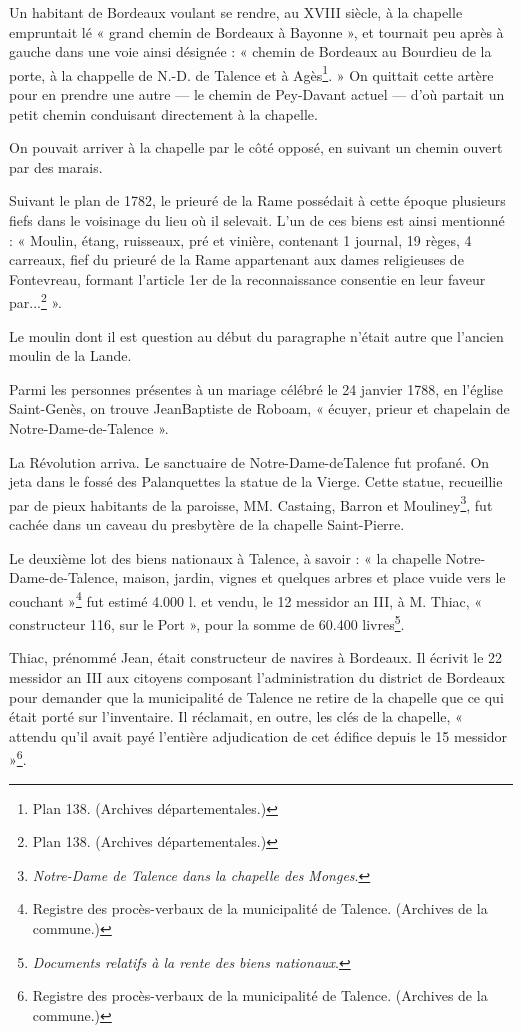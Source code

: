 Un habitant de Bordeaux voulant se rendre, au XVIII\ieme{} siècle, à la chapelle empruntait lé « grand chemin de Bordeaux à Bayonne », et tournait peu après à gauche dans une voie ainsi désignée : « chemin de Bordeaux au Bourdieu de la porte, à la chappelle de N.-D. de Talence et à Agès\footnote{Plan 138. (Archives départementales.)}. » On quittait cette artère pour en prendre une autre — le chemin de Pey-Davant actuel — d'où partait un petit chemin conduisant directement à la chapelle.

On pouvait arriver à la chapelle par le côté opposé, en suivant un chemin ouvert par des marais.

Suivant le plan de 1782, le prieuré de la Rame possédait à cette époque plusieurs fiefs dans le voisinage du lieu où il selevait. L'un de ces biens est ainsi mentionné : « Moulin, étang, ruisseaux, pré et vinière, contenant 1 journal, 19 règes, 4 carreaux, fief du prieuré de la Rame appartenant aux dames religieuses de Fontevreau, formant l'article 1er de la reconnaissance consentie en leur faveur par...\footnote{Plan 138. (Archives départementales.)} ». 

Le moulin dont il est question au début du paragraphe n'était autre que l'ancien moulin de la Lande.

Parmi les personnes présentes à un mariage célébré le 24 janvier 1788, en l'église Saint-Genès, on trouve JeanBaptiste de Roboam, « écuyer, prieur et chapelain de Notre-Dame-de-Talence ».

La Révolution arriva. Le sanctuaire de Notre-Dame-deTalence fut profané. On jeta dans le fossé des Palanquettes la statue de la Vierge. Cette statue, recueillie par de pieux habitants de la paroisse, MM. Castaing, Barron et Mouliney\footnote{\textit{Notre-Dame de Talence dans la chapelle des Monges}.}, fut cachée dans un caveau du presbytère de la chapelle Saint-Pierre.

Le deuxième lot des biens nationaux à Talence, à savoir : « la chapelle Notre-Dame-de-Talence, maison, jardin, vignes et quelques arbres et place vuide vers le couchant »\footnote{Registre des procès-verbaux de la municipalité de Talence. (Archives de la commune.)} fut estimé 4.000 l. et vendu, le 12 messidor an III, à M. Thiac, « constructeur 116, sur le Port », pour la somme de 60.400 livres\footnote{\textit{Documents relatifs à la rente des biens nationaux}.}.

Thiac, prénommé Jean, était constructeur de navires à Bordeaux. Il écrivit le 22 messidor an III aux citoyens composant l'administration du district de Bordeaux pour demander que la municipalité de Talence ne retire de la chapelle que ce qui était porté sur l'inventaire. Il réclamait, en outre, les clés de la chapelle, « attendu qu'il avait payé l'entière adjudication de cet édifice depuis le 15 messidor »\footnote{Registre des procès-verbaux de la municipalité de Talence. (Archives de la commune.)}.

